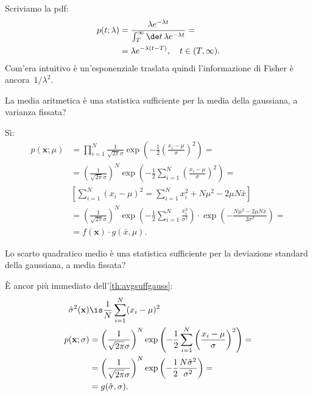 \begin{solution}
	Scriviamo la pdf:
	\begin{align*}
		p(t;\lambda)
		&= \frac {\lambda e^{-\lambda t}} {\int_T^\infty \de t\, \lambda e^{-\lambda t}} = \\
		&= \lambda e^{-\lambda (t-T)}, \quad t\in(T,\infty).
	\end{align*}
	Com'era intuitivo è un'esponenziale traslata quindi l'informazione di Fisher è ancora~$1/\lambda^2$.
\end{solution}

\begin{exercise}
	\label{th:avgsuffgauss}
	La media aritmetica è una statistica sufficiente per la media della gaussiana,
    a varianza fissata?
\end{exercise}

\begin{solution}
	Sì:
	\begin{align*}
		p(\mathbf x;\mu)
		&= \prod_{i=1}^N \frac1{\sqrt{2\pi}\sigma} 
		\exp \left( -\frac12 \left( \frac{x_i-\mu}\sigma \right)^2 \right) = \\
		&= \left( \frac1{\sqrt{2\pi}\sigma} \right)^N
		\exp \left( -\frac12 \sum_{i=1}^N \left( \frac{x_i-\mu}\sigma \right)^2 \right) = \\
		&\left[ \sum_{i=1}^N (x_i-\mu)^2
		= \sum_{i=1}^N x_i^2 + N\mu^2 - 2\mu N\bar x \right] \\
		&= \left( \frac1{\sqrt{2\pi}\sigma} \right)^N
		\exp \left( -\frac12 \sum_{i=1}^N \frac{x_i^2}{\sigma^2} \right)
		\cdot \exp \left( -\frac{N\mu^2-2\mu N\bar x}{2\sigma^2} \right) = \\
		&= f(\mathbf x) \cdot g(\bar x,\mu).
	\end{align*}
\end{solution}

\begin{exercise}
	\label{th:rmssuffgauss}
	Lo scarto quadratico medio è una statistica sufficiente per la deviazione standard della gaussiana,
    a media fissata?
\end{exercise}

\begin{solution}
	È ancor più immediato dell'\autoref{th:avgsuffgauss}:
	\begin{align*}
		\hat\sigma^2(\mathbf x)
		&\is \frac1N \sum_{i=1}^N (x_i-\mu)^2 \\
		p(\mathbf x;\sigma)
		&= \left( \frac1{\sqrt{2\pi}\sigma} \right)^N
		\exp \left( -\frac12 \sum_{i=1}^N \left( \frac{x_i-\mu}\sigma \right)^2 \right) = \\
		&= \left( \frac1{\sqrt{2\pi}\sigma} \right)^N
		\exp \left( -\frac12 \frac{N\hat\sigma^2}{\sigma^2} \right) = \\
		&= g(\hat\sigma,\sigma).
	\end{align*}
\end{solution}


